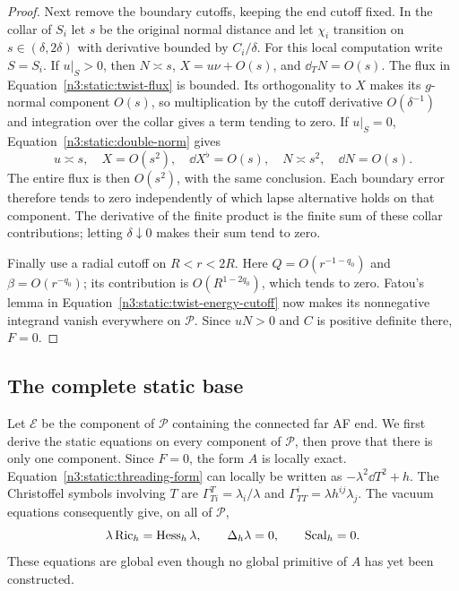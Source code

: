\begin{proof}
Next remove the boundary cutoffs, keeping the end cutoff fixed.
In the collar of $S_i$ let $s$ be the original normal distance and
let $\chi_i$ transition on $s\in(\delta,2\delta)$ with derivative
bounded by $C_i/\delta$. For this local computation write $S=S_i$.
If \(u|_S>0\), then
\(N\asymp s\), \(X=u\nu+O(s)\), and \(\dd_TN=O(s)\).
The flux in Equation~\eqref{n3:static:twist-flux} is bounded.
Its orthogonality to \(X\) makes its \(g\)-normal component \(O(s)\),
so multiplication by the cutoff derivative \(O(\delta^{-1})\)
and integration over the collar gives a term tending to zero.
If \(u|_S=0\), Equation~\eqref{n3:static:double-norm} gives
\[
u\asymp s,\quad X=O(s^2),\quad \dd X^\flat=O(s),
\quad N\asymp s^2,\quad \dd N=O(s).
\]
The entire flux is then \(O(s^2)\), with the same conclusion.
Each boundary error therefore tends to zero independently of which
lapse alternative holds on that component. The derivative of the
finite product is the finite sum of these collar contributions;
letting $\delta\downarrow0$ makes their sum tend to zero.

Finally use a radial cutoff on \(R<r<2R\).
Here \(Q=O(r^{-1-q_0})\) and \(\beta=O(r^{-q_0})\);
its contribution is \(O(R^{1-2q_0})\), which tends to zero.
Fatou's lemma in Equation~\eqref{n3:static:twist-energy-cutoff}
now makes its nonnegative integrand vanish everywhere on
\(\mathcal P\).
Since \(uN>0\) and \(C\) is positive definite there, \(F=0\).
\end{proof}

\subsection{The complete static base}
\label{n3:static:base-subsection}

Let $\mathcal E$ be the component of $\mathcal P$ containing the
connected far AF end. We first derive the static equations on every
component of $\mathcal P$, then prove that there is only one component.
Since \(F=0\), the form \(A\) is locally exact.
Equation~\eqref{n3:static:threading-form} can locally be written as
\(-\lambda^2\dd T^2+h\).
The Christoffel symbols involving \(T\) are
\(\Gamma^T_{Ti}=\lambda_i/\lambda\) and
\(\Gamma^i_{TT}=\lambda h^{ij}\lambda_j\).
The vacuum equations consequently give, on all of $\mathcal P$,
\begin{equation}
\label{n3:static:static-equations}
\lambda\operatorname{Ric}_h=\operatorname{Hess}_h\lambda,\qquad
\Delta_h\lambda=0,\qquad \operatorname{Scal}_h=0.
\end{equation}
These equations are global even though no global primitive of \(A\)
has yet been constructed.

